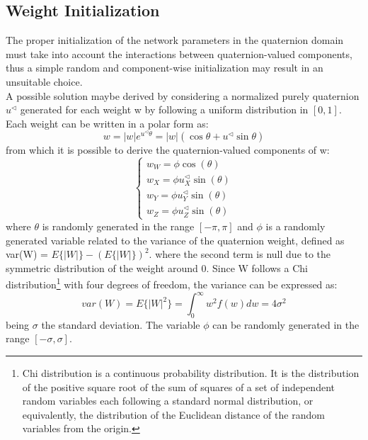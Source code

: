 \documentclass{article}
\begin{document}
    \subsection{Weight Initialization}
    The proper initialization of the network parameters in the quaternion domain must take into account the
    interactions between quaternion-valued components,  thus a simple random and component-wise initialization may result in an 
    unsuitable choice. 
    \\ A possible solution maybe derived by considering a normalized purely quaternion  $u^\triangleleft$ generated for each weight w 
    by following a uniform distribution in $[0,1]$. 
    \\ Each weight can be written in a polar form as:
    \begin{equation*}
        w= |w|e^{u^\triangleleft \theta} = |w| (\cos{\theta} + u^\triangleleft \sin{\theta}) 
    \end{equation*}
    from which it is possible to derive the quaternion-valued components of w:
    \begin{equation*}
        \begin{cases}
            w_W = \phi \cos{(\theta)} \\
            w_X = \phi u_X^\triangleleft\sin{(\theta)} \\
            w_Y = \phi u_Y^\triangleleft\sin{(\theta)} \\
            w_Z = \phi u_Z^\triangleleft\sin{(\theta)}
        \end{cases}
    \end{equation*}
    where $\theta$ is randomly generated in the range $[-\pi, \pi]$ and $\phi$ is a randomly generated variable related to the variance
    of the quaternion weight, defined as var(W) = $E\{|W|\} - (E\{|W|\})^2 $. where  the second term is null due to the symmetric 
    distribution of the weight around 0. Since W follows a Chi distribution\footnote{Chi distribution is a continuous probability 
    distribution. It is the distribution of the positive square root of the sum of squares of a set of independent random variables 
    each following a standard normal distribution, or equivalently, the distribution of the Euclidean distance of the random variables 
    from the origin.} with four degrees of freedom, the variance can be expressed as:
    \begin{equation*}
        var(W)=E\{|W|^2\}= \int_0^\infty w^2f(w) dw = 4 \sigma^2
    \end{equation*}
    being $\sigma$ the standard deviation. The variable $\phi$ can be randomly generated in the range $[-\sigma, \sigma]$.
\end{document}
